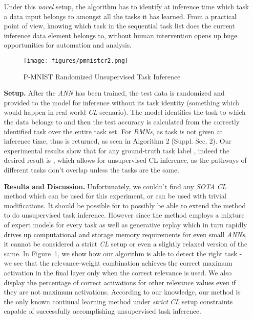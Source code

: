 \documentclass{article}
\begin{document}
Under this \textit{novel} setup, the algorithm has to identify at inference time which task a data input belongs to amongst all the tasks it has learned. From a practical point of view, knowing which task in the sequential task list does the current inference data element belongs to, without human intervention opens up huge opportunities for automation and analysis. 
\begin{figure}[ht]
\begin{center}
\centerline{\texttt{[image: figures/pmnistcr2.png]}}
\vspace*{-.2in}
\caption{P-MNIST Randomized Unsupervised Task Inference}
\label{pmnist-cr2}
\end{center}
\vskip -0.35in
\end{figure}

\textbf{Setup.} After the \textit{ANN} has been trained, the test data is randomized and provided to the model for inference without its task identity (something which would happen in real world \textit{CL} scenario). The model identifies the task to which the data belongs to and then the test accuracy is calculated from the correctly identified task over the entire task set.
For \textit{RMNs}, as task  is not given at inference time, thus  is returned, as seen in Algorithm 2 (Suppl. Sec. 2).
Our experimental results show that for any ground-truth task label , indeed the desired result is , which allows for unsupervised CL inference, as the pathways of different tasks don't overlap unless the tasks are the same.

\textbf{Results and Discussion.}
Unfortunately, we couldn't find any \textit{SOTA} \textit{CL} method which can be used for this experiment, or can be used with trivial modifications. It should be possible for \cite{lee_continual_2020} to possibly be able to extend the method to do unsupervised task inference. However since the method employs a mixture of expert models for every task as well as generative replay which in turn rapidly drives up computational and storage memory requirements for even small \textit{ANNs}, it cannot be considered a strict \textit{CL} setup or even a slightly relaxed version of the same. In Figure~\ref{pmnist-cr2}, we show how our algorithm is able to detect the right task - we see that the relevance-weight combination achieves the correct maximum activation in the final layer only when the correct relevance is used. We also display the percentage of correct activations for other relevance values even if they are not maximum activations. According to our knowledge, our method is the only known continual learning method under \textit{strict} \textit{CL} setup constraints capable of successfully accomplishing unsupervised task inference.
\end{document}

